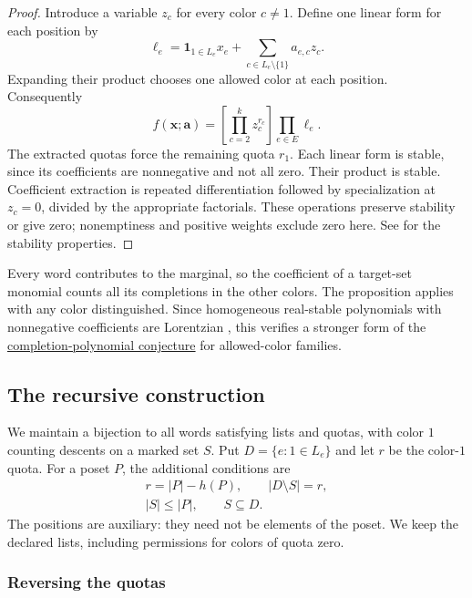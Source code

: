 \begin{proof}
Introduce a variable $z_c$ for every color $c\ne1$. Define one linear
form for each position by
\[
 \ell_e=\mathbf1_{1\in L_e}x_e+
 \sum_{c\in L_e\setminus\{1\}}a_{e,c}z_c.
\]
Expanding their product chooses one allowed color at each position.
Consequently
\[
 f(\mathbf x;\mathbf a)
 =\left[\prod_{c=2}^k z_c^{r_c}\right]\prod_{e\in E}\ell_e.
\]
The extracted quotas force the remaining quota $r_1$.
Each linear form is stable, since its coefficients are nonnegative and
not all zero. Their product is stable. Coefficient extraction is repeated
differentiation followed by specialization at $z_c=0$, divided by the
appropriate factorials. These operations preserve stability or give zero;
nonemptiness and positive weights exclude zero here. See
\cite[Section~2.1 and Lemma~2.9]{BrandenHuh2020} for the stability properties.
\end{proof}

Every word contributes to the marginal, so the coefficient of a target-set
monomial counts all its completions in the other colors. The proposition
applies with any color distinguished. Since homogeneous real-stable
polynomials with nonnegative coefficients are Lorentzian
\cite[Proposition~2.2]{BrandenHuh2020}, this verifies a stronger form of the
\href{rank.htm#lorentzianConjecture}{completion-polynomial conjecture}
for allowed-color families.

\subsection[seriesParallelRecursion]{The recursive construction}

We maintain a bijection to all words satisfying lists and quotas, with
color $1$ counting descents on a marked set $S$. Put
$D=\{e:1\in L_e\}$ and let $r$ be the color-$1$ quota.
For a poset $P$, the additional conditions are
\[
 \begin{gathered}
 r=|P|-h(P),\qquad |D\setminus S|=r,\\
 |S|\leq|P|,\qquad S\subseteq D.
 \end{gathered}
\]
The positions are auxiliary: they need not be elements of the poset.
We keep the declared lists, including permissions for colors of quota zero.

\subsubsection[quotaReversal]{Reversing the quotas}

